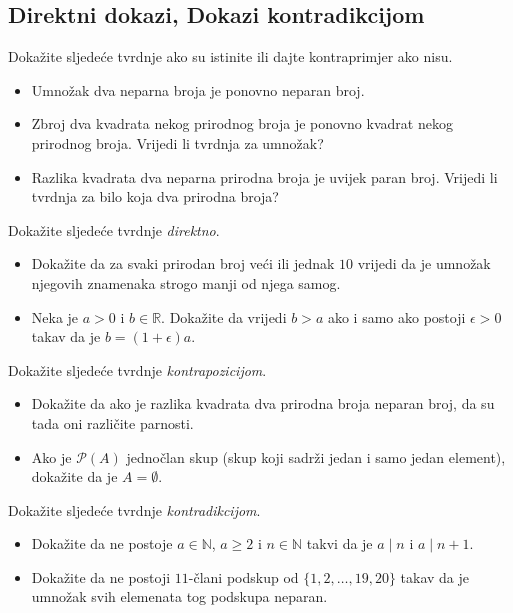 \subsection*{Direktni dokazi, Dokazi kontradikcijom}
\begin{exercise}{\unskip} Dokažite sljedeće tvrdnje ako su istinite ili dajte kontraprimjer ako nisu.
\begin{itemize}
\item[a)] Umnožak dva neparna broja je ponovno neparan broj.
\item[b)] Zbroj dva kvadrata nekog prirodnog broja je ponovno kvadrat nekog prirodnog broja. Vrijedi li tvrdnja za umnožak?
\item[c)] Razlika kvadrata dva neparna prirodna broja je uvijek paran broj. Vrijedi li tvrdnja za bilo koja dva prirodna broja?
\end{itemize}
\end{exercise}
\begin{exercise}{\unskip} Dokažite sljedeće tvrdnje \textit{direktno}.
\begin{itemize}
\item[a)] Dokažite da za svaki prirodan broj veći ili jednak $10$ vrijedi da je umnožak njegovih znamenaka strogo manji od njega samog.
\item[b)] Neka je \(a>0\) i \(b\in \mathbb{R}\). Dokažite da vrijedi \(b>a\) ako i samo ako postoji \(\epsilon>0\) takav da je \(b=(1+\epsilon)a\).
\end{itemize}
\end{exercise}
\begin{exercise}{\unskip} Dokažite sljedeće tvrdnje \textit{kontrapozicijom}.
\begin{itemize}
\item[a)] Dokažite da ako je razlika kvadrata dva prirodna broja neparan broj, da su tada oni različite parnosti.
\item[b)] Ako je \(\mathcal{P}(A)\) jednočlan skup (skup koji sadrži jedan i samo jedan element), dokažite da je \(A=\emptyset\).
\end{itemize}
\end{exercise}
\begin{exercise}{\unskip} Dokažite sljedeće tvrdnje \textit{kontradikcijom}.
\begin{itemize}
\item[a)] Dokažite da ne postoje $a\in \mathbb{N}$, $a\geq 2$ i $n\in \mathbb{N}$ takvi da je $a \mid n$ i $a \mid n+1$.
\item[b)] Dokažite da ne postoji $11$-člani podskup od $\{1, 2, \dots, 19, 20\}$ takav da je umnožak svih elemenata tog podskupa neparan.
\end{itemize}
\end{exercise}

